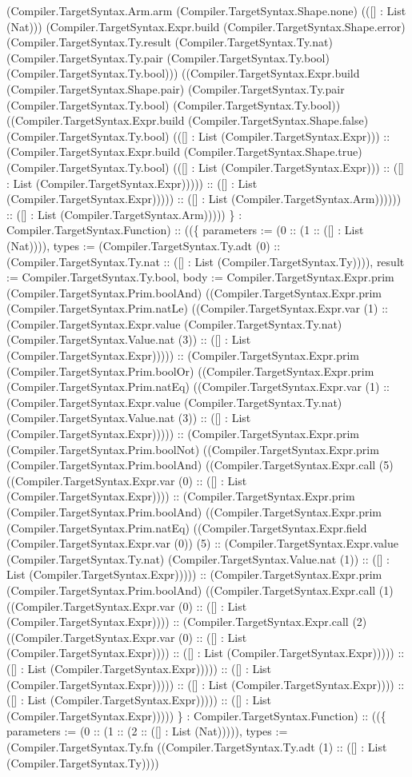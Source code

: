 \documentclass[11pt]{article}
\begin{document}
(Compiler.TargetSyntax.Arm.arm (Compiler.TargetSyntax.Shape.none) (([] : List (Nat))) (Compiler.TargetSyntax.Expr.build (Compiler.TargetSyntax.Shape.error) (Compiler.TargetSyntax.Ty.result (Compiler.TargetSyntax.Ty.nat) (Compiler.TargetSyntax.Ty.pair (Compiler.TargetSyntax.Ty.bool) (Compiler.TargetSyntax.Ty.bool))) ((Compiler.TargetSyntax.Expr.build (Compiler.TargetSyntax.Shape.pair) (Compiler.TargetSyntax.Ty.pair (Compiler.TargetSyntax.Ty.bool) (Compiler.TargetSyntax.Ty.bool)) ((Compiler.TargetSyntax.Expr.build (Compiler.TargetSyntax.Shape.false) (Compiler.TargetSyntax.Ty.bool) (([] : List (Compiler.TargetSyntax.Expr))) :: (Compiler.TargetSyntax.Expr.build (Compiler.TargetSyntax.Shape.true) (Compiler.TargetSyntax.Ty.bool) (([] : List (Compiler.TargetSyntax.Expr))) :: ([] : List (Compiler.TargetSyntax.Expr))))) :: ([] : List (Compiler.TargetSyntax.Expr))))) :: ([] : List (Compiler.TargetSyntax.Arm)))))) :: ([] : List (Compiler.TargetSyntax.Arm))))) \} : Compiler.TargetSyntax.Function) :: ((\{ parameters := (0 :: (1 :: ([] : List (Nat)))), types := (Compiler.TargetSyntax.Ty.adt (0) :: (Compiler.TargetSyntax.Ty.nat :: ([] : List (Compiler.TargetSyntax.Ty)))), result := Compiler.TargetSyntax.Ty.bool, body := Compiler.TargetSyntax.Expr.prim (Compiler.TargetSyntax.Prim.boolAnd) ((Compiler.TargetSyntax.Expr.prim (Compiler.TargetSyntax.Prim.natLe) ((Compiler.TargetSyntax.Expr.var (1) :: (Compiler.TargetSyntax.Expr.value (Compiler.TargetSyntax.Ty.nat) (Compiler.TargetSyntax.Value.nat (3)) :: ([] : List (Compiler.TargetSyntax.Expr))))) :: (Compiler.TargetSyntax.Expr.prim (Compiler.TargetSyntax.Prim.boolOr) ((Compiler.TargetSyntax.Expr.prim (Compiler.TargetSyntax.Prim.natEq) ((Compiler.TargetSyntax.Expr.var (1) :: (Compiler.TargetSyntax.Expr.value (Compiler.TargetSyntax.Ty.nat) (Compiler.TargetSyntax.Value.nat (3)) :: ([] : List (Compiler.TargetSyntax.Expr))))) :: (Compiler.TargetSyntax.Expr.prim (Compiler.TargetSyntax.Prim.boolNot) ((Compiler.TargetSyntax.Expr.prim (Compiler.TargetSyntax.Prim.boolAnd) ((Compiler.TargetSyntax.Expr.call (5) ((Compiler.TargetSyntax.Expr.var (0) :: ([] : List (Compiler.TargetSyntax.Expr)))) :: (Compiler.TargetSyntax.Expr.prim (Compiler.TargetSyntax.Prim.boolAnd) ((Compiler.TargetSyntax.Expr.prim (Compiler.TargetSyntax.Prim.natEq) ((Compiler.TargetSyntax.Expr.field (Compiler.TargetSyntax.Expr.var (0)) (5) :: (Compiler.TargetSyntax.Expr.value (Compiler.TargetSyntax.Ty.nat) (Compiler.TargetSyntax.Value.nat (1)) :: ([] : List (Compiler.TargetSyntax.Expr))))) :: (Compiler.TargetSyntax.Expr.prim (Compiler.TargetSyntax.Prim.boolAnd) ((Compiler.TargetSyntax.Expr.call (1) ((Compiler.TargetSyntax.Expr.var (0) :: ([] : List (Compiler.TargetSyntax.Expr)))) :: (Compiler.TargetSyntax.Expr.call (2) ((Compiler.TargetSyntax.Expr.var (0) :: ([] : List (Compiler.TargetSyntax.Expr)))) :: ([] : List (Compiler.TargetSyntax.Expr))))) :: ([] : List (Compiler.TargetSyntax.Expr))))) :: ([] : List (Compiler.TargetSyntax.Expr))))) :: ([] : List (Compiler.TargetSyntax.Expr)))) :: ([] : List (Compiler.TargetSyntax.Expr))))) :: ([] : List (Compiler.TargetSyntax.Expr))))) \} : Compiler.TargetSyntax.Function) :: ((\{ parameters := (0 :: (1 :: (2 :: ([] : List (Nat))))), types := (Compiler.TargetSyntax.Ty.fn ((Compiler.TargetSyntax.Ty.adt (1) :: ([] : List (Compiler.TargetSyntax.Ty)))) 
\end{document}
